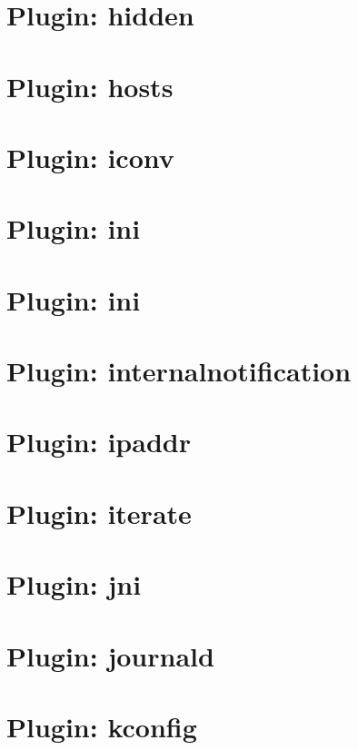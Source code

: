 \let\mypdfximage\pdfximage\def\pdfximage{\immediate\mypdfximage}\documentclass[twoside]{book}
\newcommand{\+}{\discretionary{\mbox{\scriptsize$\hookleftarrow$}}{}{}}
\begin{document}
\chapter{Plugin\+: hidden}
\label{autotoc_md267}

\chapter{Plugin\+: hosts}
\label{autotoc_md268}

\chapter{Plugin\+: iconv}
\label{autotoc_md285}

\chapter{Plugin\+: ini}
\label{autotoc_md291}

\chapter{Plugin\+: ini}
\label{autotoc_md292}

\chapter{Plugin\+: internalnotification}
\label{autotoc_md321}

\chapter{Plugin\+: ipaddr}
\label{autotoc_md323}

\chapter{Plugin\+: iterate}
\label{autotoc_md340}

\chapter{Plugin\+: jni}
\label{autotoc_md341}

\chapter{Plugin\+: journald}
\label{autotoc_md351}

\chapter{Plugin\+: kconfig}
\label{autotoc_md353}

\end{document}

